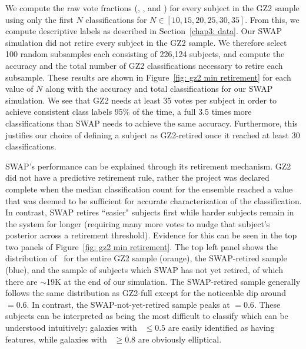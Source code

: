 We compute the raw vote fractions (\ffeat, \fsmooth, and \fstar) for every subject in the GZ2 sample using only the first $N$ classifications for $N \in [10, 15, 20, 25, 30, 35]$. From this, we compute descriptive labels as described in Section~\ref{chap3: data}. Our SWAP simulation did not retire every subject in the GZ2 sample. We therefore select 100 random subsamples each consisting of 226,124 subjects, and compute the accuracy and the total number of GZ2 classifications necessary to retire each subsample. These results are shown in Figure~\ref{fig: gz2 min retirement} for each value of $N$ along with the accuracy and total classifications for our SWAP simulation. We see that GZ2 needs at least 35 votes per subject in order to achieve consistent class labels 95\% of the time,  a full 3.5 times more classifications than  SWAP needs to achieve the same accuracy. Furthermore, this justifies our choice of defining a subject as GZ2-retired once it reached at least 30 classifications.

SWAP's performance can be explained through its retirement mechanism. GZ2 did not have a predictive retirement rule, rather the project was declared complete when the median classification count for the ensemble reached a value that was deemed to be sufficient for accurate characterization of the classification. In contrast, SWAP retires ``easier" subjects first while harder subjects remain in the system for longer (requiring many more votes to nudge that subject's posterior across a retirement threshold).  Evidence for this can be seen in the top two panels of Figure~\ref{fig: gz2 min retirement}. The top left panel shows the distribution of \fsmooth~for the entire GZ2 sample (orange), the SWAP-retired sample (blue), and the sample of subjects which SWAP has not yet retired, of which there are $\sim$19K at the end of our simulation. The SWAP-retired sample generally follows the same distribution as GZ2-full except for the noticeable dip around \fsmooth$=0.6$. In contrast, the SWAP-not-yet-retired sample peaks at \fsmooth$=0.6$. These subjects can be interpreted as being the most difficult to classify which can be understood intuitively: galaxies with \fsmooth~$\le 0.5$ are easily identified as having features, while galaxies with \fsmooth~$\ge 0.8$ are obviously elliptical.

